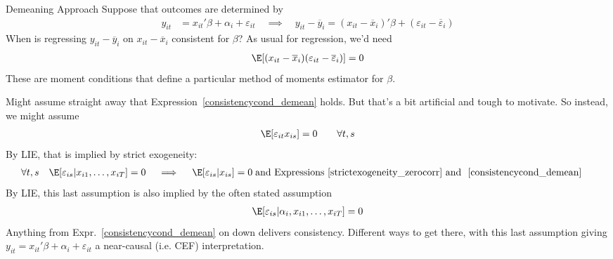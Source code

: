\documentclass[aspectratio=169, handout]{beamer}
\begin{document}
{\scriptsize
\begin{frame}{Demeaning Approach}
Suppose that outcomes are determined by
\begin{align}
  y_{it}
  &=
  x_{it}'\beta
  + \alpha_i
  + \varepsilon_{it}
  \quad\implies\quad
  y_{it} - \overline{y}_i
  =
  (x_{it}-\overline{x}_i)'\beta
  + (\varepsilon_{it}-\overline{\varepsilon}_i)
\end{align}
When is regressing $y_{it}-\overline{y}_i$ on $x_{it}-\overline{x}_i$
\alert{consistent} for $\beta$?
\pause
As usual for regression, we'd need
\begin{align}
  \E[
  (x_{it} - \overline{x}_i)
  (\varepsilon_{it}-\overline{\varepsilon}_i)
  ]
  = 0
  \label{consistencycond_demean}
\end{align}
These are moment conditions that define a particular method of moments
estimator for $\beta$.

Might assume straight away that Expression~\ref{consistencycond_demean}
holds.
But that's a bit artificial and tough to motivate.
So instead, we might assume
\begin{align}
  \E[\varepsilon_{it}x_{is}]
  =
  0
  \qquad
  \forall t,s
  \label{strictexogeneity_zerocorr}
\end{align}
By LIE, that is implied by \alert{strict exogeneity}:
\begin{align}
  \forall t,s
  \quad
  \E[\varepsilon_{is}|x_{i1},\ldots,x_{iT}]
  &= 0
  \quad\implies\quad
  \E[\varepsilon_{is}|x_{is}]=0
  \;\text{and Expressions~\ref{strictexogeneity_zerocorr} and ~\ref{consistencycond_demean}}\;
  \label{strictexogeneity}
\end{align}
\pause
By LIE, this last assumption is also implied by the often stated
assumption
\begin{align*}
  \E[\varepsilon_{is}|\alpha_i,x_{i1},\ldots,x_{iT}]
  = 0
\end{align*}
Anything from Expr.~\ref{consistencycond_demean} on down delivers
consistency.
Different ways to get there, with this last assumption giving
$y_{it}=x_{it}'\beta+\alpha_i+\varepsilon_{it}$ a near-causal (i.e. CEF)
interpretation.
\end{frame}
}
\end{document}
